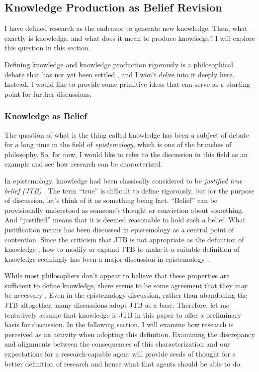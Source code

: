 \subsection{Knowledge Production as Belief Revision}
\label{section-knowledge-production-as-belief-revision}
I have defined research as the endeavor to generate new knowledge. Then, what exactly is knowledge, and what does it mean to produce knowledge? I will explore this question in this section. 

Defining knowledge and knowledge production rigorously is a philosophical debate that has not yet been settled \cite{sep-epistemology}, and I won't delve into it deeply here. Instead, I would like to provide some primitive ideas that can serve as a starting point for further discussions.

\subsubsection{Knowledge as Belief}
The question of what is the thing called knowledge has been a subject of debate for a long time in the field of \textit{epistemology}, which is one of the branches of philosophy. So, for now, I would like to refer to the discussion in this field as an example and see how research can be characterized.

In epistemology, knowledge had been classically considered to be \textit{justified true belief (JTB)} \cite{sep-epistemology}. The term ``true'' is difficult to define rigorously, but for the purpose of discussion, let's think of it as something being fact. ``Belief'' can be provisionally understood as someone's thought or conviction about something. And ``justified'' means that it is deemed reasonable to hold such a belief. What justification means has been discussed in epistemology as a central point of contention. Since the criticism that JTB is not appropriate as the definition of knowledge \cite{gettier1963justified}, how to modify or expand JTB to make it a suitable definition of knowledge seemingly has been a major discussion in epistemology \cite{sep-epistemology}. 

While most philosophers don't appear to believe that these properties are sufficient to define knowledge, there seems to be some agreement that they may be necessary \cite{sep-epistemology}. Even in the epistemology discussion, rather than abandoning the JTB altogether, many discussions adopt JTB as a base. Therefore, let me tentatively assume that knowledge is JTB in this paper to offer a preliminary basis for discussion. In the following section, I will examine how research is perceived as an activity when adopting this definition. Examining the discrepancy and alignments between the consequences of this characterization and our expectations for a research-capable agent will provide seeds of thought for a better definition of research and hence what that agents should be able to do.

